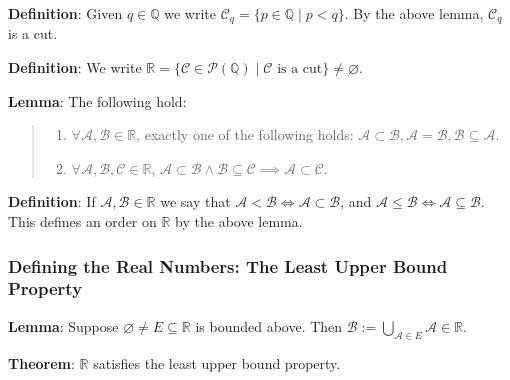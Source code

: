 \documentclass[11pt]{article}
\begin{document}
\textbf{Definition}: Given $q \in \mathbb{Q}$ we write $\mathcal{C}_q = \{p \in \mathbb{Q} \;|\; p < q\}$. By the above lemma, $\mathcal{C}_q$ is a cut.

\textbf{Definition}: We write $\mathbb{R} = \{\mathcal{C} \in \mathcal{P}(\mathbb{Q}) \;|\; \mathcal{C} \text{ is a cut}\} \neq \varnothing$.

\textbf{Lemma}: The following hold:
\begin{quote}\vspace{-0.3cm}
	\begin{enumerate}
	\item $\forall \mathcal{A}, \mathcal{B} \in \mathbb{R}$, exactly one of the following holds: $\mathcal{A} \subset \mathcal{B}, \mathcal{A} = \mathcal{B}, \mathcal{B} \subseteq \mathcal{A}$.
	\item $\forall \mathcal{A}, \mathcal{B}, \mathcal{C} \in \mathbb{R}$, $\mathcal{A} \subset \mathcal{B} \land \mathcal{B} \subseteq \mathcal{C} \implies \mathcal{A} \subset \mathcal{C}$.
	\end{enumerate}
\end{quote}

\textbf{Definition}: If $\mathcal{A}, \mathcal{B} \in \mathbb{R}$ we say that $\mathcal{A} < \mathcal{B} \iff \mathcal{A} \subset \mathcal{B}$, and $\mathcal{A} \leq \mathcal{B} \iff \mathcal{A} \subseteq \mathcal{B}$. This defines an order on $\mathbb{R}$ by the above lemma.

\subsubsection{Defining the Real Numbers: The Least Upper Bound Property}

\textbf{Lemma}: Suppose $\varnothing \neq E \subseteq \mathbb{R}$ is bounded above. Then $\mathcal{B} := \bigcup_{\mathcal{A} \in E} \mathcal{A} \in \mathbb{R}$.

\textbf{Theorem}: $\mathbb{R}$ satisfies the least upper bound property.
\end{document}
